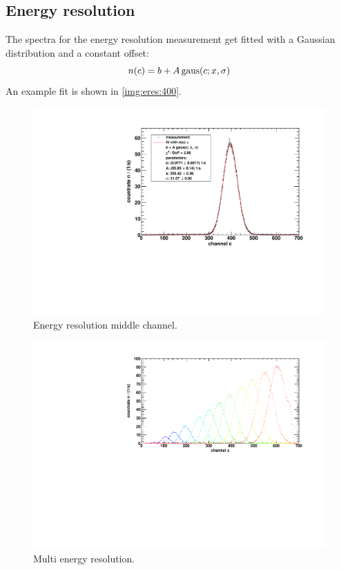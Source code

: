 \subsection{Energy resolution}
The spectra for the energy resolution measurement get fitted with a Gaussian distribution and a constant offset:
\begin{equation}
    n(c) = b + A \operatorname{gaus}(c;x,\sigma)
\end{equation}
An example fit is shown in \autoref{img:eres:400}.
\begin{figure}[H]
\begin{center}
  \includegraphics[width=\textwidth]{../img/energieaufloesung_400.pdf}
  \caption{Energy resolution middle channel.}
  \label{img:eres:400}
\end{center}
\end{figure}

\begin{figure}[H]
\begin{center}
  \includegraphics[width=\textwidth]{../img/energieaufloesung_multi.pdf}
  \caption{Multi energy resolution.}
  \label{img:eres:multi}
\end{center}
\end{figure}


